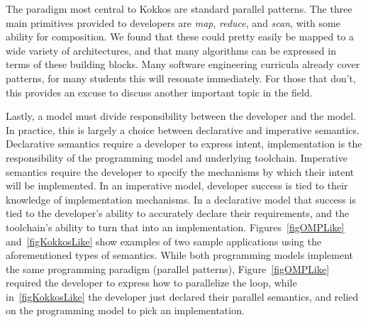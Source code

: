 

The paradigm most central to Kokkos are standard parallel patterns. The three main primitives provided to developers are \emph{map}, \emph{reduce}, and \emph{scan}, with some ability for composition. We found that these could pretty easily be mapped to a wide variety of architectures, and that many algorithms can be expressed in terms of these building blocks. Many software engineering curricula already cover patterns, for many students this will resonate immediately. For those that don't, this provides an excuse to discuss another important topic in the field.

Lastly, a model must divide responsibility between the developer and the model. In practice, this is largely a choice between declarative and imperative semantics. Declarative semantics require a developer to express intent, implementation is the responsibility of the programming model and underlying toolchain. Imperative semantics require the developer to specify the mechanisms by which their intent will be implemented. In an imperative model, developer success is tied to their knowledge of implementation mechanisms. In a declarative model that success is tied to the developer's ability to accurately declare their requirements, and the toolchain's ability to turn that into an implementation. Figures~\ref{figOMPLike} and~\ref{figKokkosLike} show examples of two sample applications using the aforementioned types of semantics. While both programming models implement the same programming paradigm (parallel patterns), Figure~\ref{figOMPLike} required the developer to express how to parallelize the loop, while in~\ref{figKokkosLike} the developer just declared their parallel semantics, and relied on the programming model to pick an implementation. 

